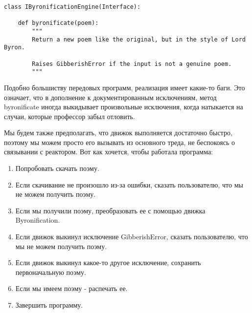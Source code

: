  \begin{verbatim}
class IByronificationEngine(Interface):

    def byronificate(poem):
        """
        Return a new poem like the original, but in the style of Lord Byron.

        Raises GibberishError if the input is not a genuine poem.
        """
\end{verbatim} 


Подобно большиству передовых программ, реализация 
имеет какие-то баги. Это означает, что в дополнение к 
документированным исключениям, метод byronificate иногда 
выкидывает произвольные исключения, когда натыкается на 
случаи, которые профессор забыл отловить.


Мы будем также предполагать, что движок выполняется достаточно 
быстро, поэтому мы можем просто его вызывать из основного треда, 
не беспокоясь о связывании с реактором. Вот как хочется, чтобы 
работала программа:

\begin{enumerate}

\item Попробовать скачать поэму.

\item Если скачивание не произошло из-за ошибки, сказать пользователю, 
что мы не можем получить поэму.

\item Если мы получили поэму, преобразовать ее с помощью движка Byronification.

\item Если движок выкинул исключение GibberishError, сказать 
пользователю, что мы не можем получить поэму.

\item Если движок выкинул какое-то другое исключение, 
сохранить первоначальную поэму.

\item Если мы имеем поэму - распечать ее.

\item Завершить программу.

\end{enumerate}

